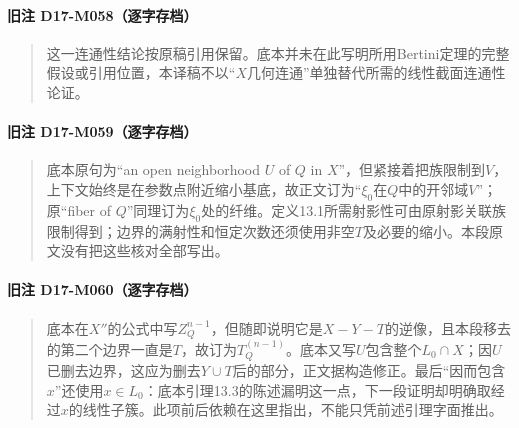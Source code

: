 \paragraph*{旧注 D17-M058（逐字存档）}
\begin{quote}
这一连通性结论按原稿引用保留。底本并未在此写明所用Bertini定理的完整假设或引用位置，本译稿不以“$X$几何连通”单独替代所需的线性截面连通性论证。
\end{quote}

\paragraph*{旧注 D17-M059（逐字存档）}
\begin{quote}
底本原句为“an open neighborhood $U$ of $Q$ in $X$”，但紧接着把族限制到$V$，上下文始终是在参数点附近缩小基底，故正文订为“$\xi_0$在$Q$中的开邻域$V$”；原“fiber of $Q$”同理订为$\xi_0$处的纤维。定义13.1所需射影性可由原射影关联族限制得到；边界的满射性和恒定次数还须使用非空$T$及必要的缩小。本段原文没有把这些核对全部写出。
\end{quote}

\paragraph*{旧注 D17-M060（逐字存档）}
\begin{quote}
底本在$X''$的公式中写$Z_Q^{n-1}$，但随即说明它是$X-Y-T$的逆像，且本段移去的第二个边界一直是$T$，故订为$T_Q^{(n-1)}$。底本又写$U$包含整个$L_0\cap X$；因$U$已删去边界，这应为删去$Y\cup T$后的部分，正文据构造修正。最后“因而包含$x$”还使用$x\in L_0$：底本引理13.3的陈述漏明这一点，下一段证明却明确取经过$x$的线性子簇。此项前后依赖在这里指出，不能只凭前述引理字面推出。
\end{quote}

